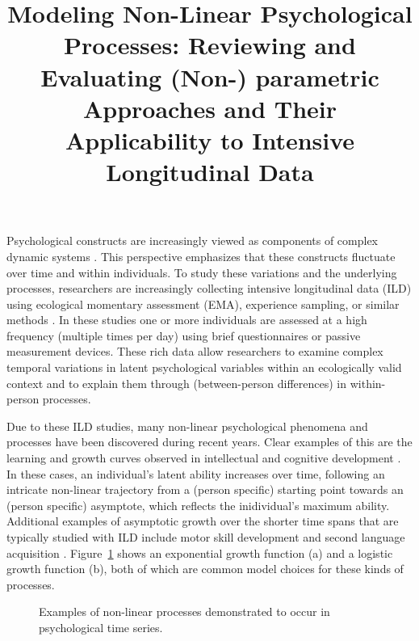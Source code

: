 \documentclass[man, floatsintext]{apa7}
\title{Modeling Non-Linear Psychological Processes: Reviewing and Evaluating
  (Non-) parametric Approaches and Their Applicability to Intensive
  Longitudinal
  Data}
\begin{document}
\maketitle

Psychological constructs are increasingly viewed as components of complex
dynamic systems \parencite{nesselroade_studying_2004, wang_investigating_2012}.
This perspective emphasizes that these constructs fluctuate over time and
within individuals. To study these variations and the underlying processes,
researchers are increasingly collecting intensive longitudinal data (ILD) using
ecological momentary assessment (EMA), experience sampling, or similar methods
\parencite{fritz_so_2023}. In these studies one or more individuals are
assessed at a high frequency (multiple times per day) using brief
questionnaires or passive measurement devices. These rich data allow
researchers to examine complex temporal variations in latent psychological
variables within an ecologically valid context and to explain them through
(between-person differences) in within-person processes.

Due to these ILD studies, many non-linear psychological phenomena and processes
have been discovered during recent years. Clear examples of this are the
learning and growth curves observed in intellectual and cognitive development
\parencite{kunnen_dynamic_2012, mcardle_comparative_2002}. In these cases, an
individual's latent ability increases over time, following an intricate
non-linear trajectory from a (person specific) starting point towards an
(person specific) asymptote, which reflects the inidividual's
maximum ability. Additional examples of asymptotic growth over the shorter
time spans that are typically studied with ILD include
motor skill development \parencite{newell_time_2001} and second language
acquisition \parencite{de_bot_dynamic_2007}. Figure~\ref{fig:examplar_npn}
shows an exponential growth function (a) and a logistic growth function (b),
both of which are common model choices for these kinds of processes.

\begin{figure}[!ht]
  \caption{Examples of non-linear processes demonstrated to occur in
    psychological time series.}
  \label{fig:examplar_npn}
\end{figure}
\end{document}
